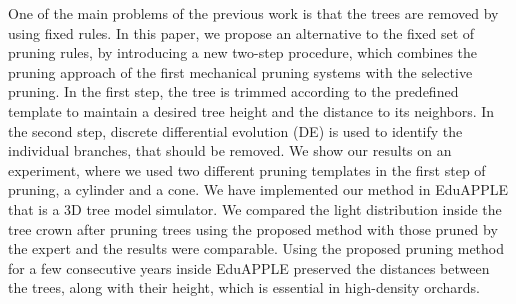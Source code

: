 One of the main problems of the previous work is that the trees are
removed by using fixed rules. In this paper, we propose an alternative
to the fixed set of pruning rules, by introducing a new two-step
procedure, which combines the pruning approach of the first mechanical
pruning systems with the selective pruning. In the first step, the tree
is trimmed according to the predefined template to maintain a desired
tree height and the distance to its neighbors. In the second step,
discrete differential evolution (DE) \cite{strnad_novel_2017} is used to identify the
individual branches, that should be removed. We show our results on an
experiment, where we used two different pruning templates in the first
step of pruning, a cylinder and a cone. We have implemented our method
in EduAPPLE \cite{kohek_eduapple:_2015} that is a 3D tree model simulator. We compared the
light distribution inside the tree crown after pruning trees using the
proposed method with those pruned by the expert and the results were
comparable. Using the proposed pruning method for a few consecutive
years inside EduAPPLE preserved the distances between the trees, along
with their height, which is essential in high-density orchards.
